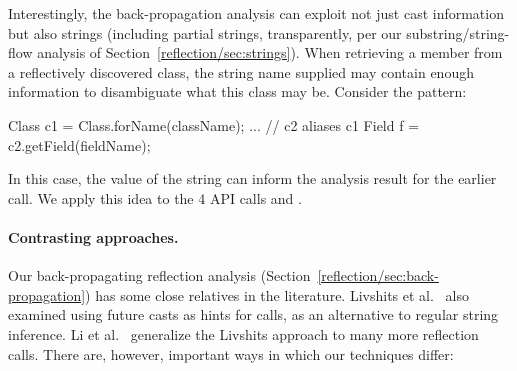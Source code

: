 Interestingly, the back-propagation analysis can exploit not just cast
information but also strings (including partial strings, transparently,
per our substring/string-flow analysis of Section~\ref{reflection/sec:strings}).
When retrieving a member from a reflectively discovered class, the
string name supplied may contain enough information to disambiguate
what this class may be. Consider the pattern:

\begin{javacodelinum}
Class c1 = Class.forName(className);
...      // c2 aliases c1
Field f = c2.getField(fieldName); 
\end{javacodelinum}

In this case, the value of the  string can inform the
analysis result for the earlier  call. We apply this
idea to the 4 API calls  and
.

\paragraph{Contrasting approaches.}

Our back-propagating reflection analysis
(Section~\ref{reflection/sec:back-propagation}) has some close
relatives in the literature.  Livshits et
al.~\cite{aplas/LivshitsWL05,livshits:thesis} also examined using
future casts as hints for  calls, as an alternative to
regular string inference. Li et al.~\cite{ecoop/LiTSX14} generalize
the Livshits approach to many more reflection calls. There are,
however, important ways in which our techniques differ:

